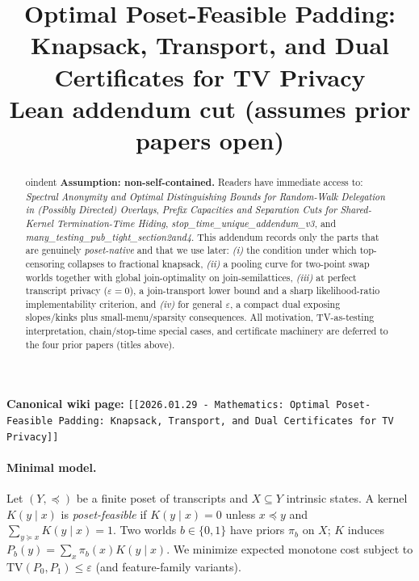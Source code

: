 \documentclass[11pt]{article}
\title{Optimal Poset-Feasible Padding: Knapsack, Transport, and Dual Certificates for TV Privacy\\
\large Lean addendum cut (assumes prior papers open)}
\author{}
\date{}
\theoremstyle{definition}
\theoremstyle{remark}
\newcommand{\TV}{\mathrm{TV}}
\begin{document}
\maketitle

\noindent\textbf{Canonical wiki page:} \texttt{[[2026.01.29 - Mathematics: Optimal Poset-Feasible Padding: Knapsack, Transport, and Dual Certificates for TV Privacy]]}\\


\vspace{-0.75em}
\begin{abstract}
oindent
\textbf{Assumption: non-self-contained.} Readers have immediate access to:
\emph{Spectral Anonymity and Optimal Distinguishing Bounds for Random-Walk Delegation in (Possibly Directed) Overlays},
\emph{Prefix Capacities and Separation Cuts for Shared-Kernel Termination-Time Hiding},
\emph{stop\_time\_unique\_addendum\_v3},
and \emph{many\_testing\_pub\_tight\_section2and4}.
This addendum records only the parts that are genuinely \emph{poset-native} and that we use later:
\emph{(i)} the condition under which top-censoring collapses to fractional knapsack,
\emph{(ii)} a pooling curve for two-point swap worlds together with global join-optimality on join-semilattices,
\emph{(iii)} at perfect transcript privacy ($\varepsilon=0$), a join-transport lower bound and a sharp likelihood-ratio implementability criterion,
and \emph{(iv)} for general $\varepsilon$, a compact dual exposing slopes/kinks plus small-menu/sparsity consequences.
All motivation, TV-as-testing interpretation, chain/stop-time special cases, and certificate machinery are deferred to the four prior papers (titles above).
\end{abstract}

\paragraph{Minimal model.}
Let $(Y,\preceq)$ be a finite poset of transcripts and $X\subseteq Y$ intrinsic states.
A kernel $K(y\mid x)$ is \emph{poset-feasible} if $K(y\mid x)=0$ unless $x\preceq y$ and $\sum_{y\succeq x}K(y\mid x)=1$.
Two worlds $b\in\{0,1\}$ have priors $\pi_b$ on $X$; $K$ induces $P_b(y)=\sum_x \pi_b(x)K(y\mid x)$.
We minimize expected monotone cost subject to $\TV(P_0,P_1)\le \varepsilon$ (and feature-family variants).
\end{document}
